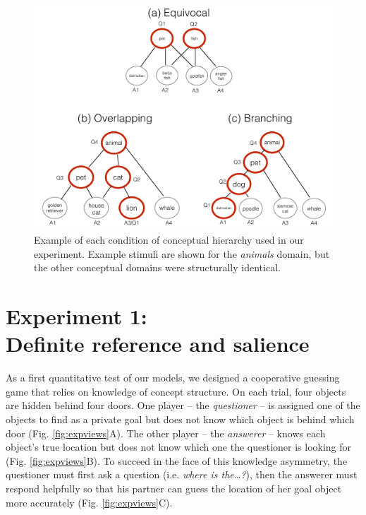 \documentclass[12pt, floatsintext, jou]{apa6}
\begin{document}
\begin{figure}[th!]
\begin{center}
\includegraphics[scale = .5]{Exp1/hierarchyStructureExamples.pdf}
\end{center}
\caption{\footnotesize  Example of each condition of conceptual hierarchy used in our experiment. Example stimuli are shown for the \emph{animals} domain, but the other conceptual domains were structurally identical.}
\label{fig:hierarchyStructures}
\end{figure}
\section{Experiment 1: \\ Definite reference and salience}

As a first quantitative test of our models, we designed a cooperative guessing game that relies on knowledge of concept structure. 
On each trial, four objects are hidden behind four doors.
One player -- the \emph{questioner} -- is assigned one of the objects to find as a private goal but does not know which object is behind which door (Fig. \ref{fig:expviews}A).
The other player -- the \emph{answerer} -- knows each object's true location but does not know which one the questioner is looking for (Fig. \ref{fig:expviews}B). 
To succeed in the face of this knowledge asymmetry, the questioner must first ask a question (i.e. \emph{where is the\dots?}), then the answerer must respond helpfully so that his partner can guess the location of her goal object more accurately (Fig. \ref{fig:expviews}C).
\end{document}
